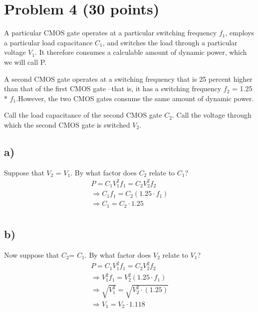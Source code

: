 \documentclass{article}
\begin{document}
\section*{Problem 4 (30 points)}
A particular CMOS gate operates at a particular switching frequency $f_1$, employs a particular load capacitance  $C_1$,  and  switches the  load  through a  particular  voltage  $V_1$.  It  therefore  consumes  a  calculable amount of dynamic power, which we will call P. 
\vspace{5mm}

A second CMOS gate operates at a switching frequency that is 25 percent higher than that of the first CMOS gate –that is, it has a switching frequency $f_2$ = 1.25 * $f_1$.However, the two CMOS gates consume the same amount of dynamic power.
\vspace{5mm}

Call the load capacitance of the second CMOS gate $C_2$. Call the voltage through which the second CMOS gate is switched $V_2$.

\subsection*{a)}
Suppose that $V_2$ = $V_1$. By what factor does $C_2$ relate to $C_1$?
\begin{align}
    P = C_1V_1^2f_1 = C_2V_2^2f_2\\
    \Rightarrow C_1f_1 = C_2(1.25 \cdot f_1)\\
    \Rightarrow \boxed{C_1 = C_2 \cdot 1.25}\\
\end{align}
\subsection*{b)}
Now suppose that $C_2$= $C_1$. By what factor does $V_2$ relate to $V_1$?
\begin{align}
    P = C_1V_1^2f_1 = C_2V_2^2f_2\\
    \Rightarrow V_1^2f_1 = V_2^2(1.25 \cdot f_1)\\
    \Rightarrow \sqrt{V_1^2} = \sqrt{V_2^2\cdot(1.25)}\\
    \Rightarrow \boxed{V_1 = V_2\cdot 1.118}\\
\end{align}
\newpage
\end{document}
